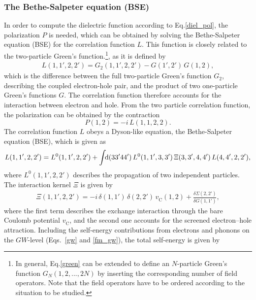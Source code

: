 \subsubsection{The Bethe-Salpeter equation (BSE)}\label{bse_subsec}
In order to compute the dielectric function according to Eq.\;\eqref{diel_pol}, the polarization $P$ is needed, which can be obtained by solving the Bethe-Salpeter equation (BSE) for the correlation function $L$. This function is closely  related to the two-particle Green's function.\footnote[2]{In general, Eq.\;\eqref{green} can be extended to define an $N$-particle Green's function $G_N(1,2,...,2N)$ by inserting the corresponding number of field operators. Note that the field operators have to be ordered according to the situation to be studied.}, as it is defined by
%
\begin{align}\label{corr}
    L(1,1',2,2') = G_2(1,1',2,2') - G(1',2')\,G(1,2), 
\end{align}
%
which is the difference between the full two-particle Green's  function $G_2$, describing the coupled electron-hole pair, and the product of two one-particle Green's functions $G$. The correlation function therefore accounts for the interaction between electron and hole. From the two particle correlation function, the polarization can be obtained by the contraction
%
\begin{equation}
    P(1,2) = -i\,L(1,1,2,2).
\end{equation}
%
The correlation function $L$ obeys a Dyson-like equation, the Bethe-Salpeter equation (BSE), which is given as
%
\begin{align}\label{bse}
        L(1,1',2,2') = L^0(1,1',2,2') + \int\text{\!\!d}(33'44')\,L^0(1,1',3,3')\,\Xi(3,3',4,4')\,L(4,4',2,2'),
\end{align}
%
where $L^0(1,1',2,2')$ describes the propagation of two independent particles. The interaction kernel $\Xi$ is given by\cite{strinati1988application}
%
\begin{align}\label{kernel}
    \Xi(1,1',2,2') = -i\,\delta(1,1')\,\delta(2,2')\,v_\text{C}^{\phantom{I}}(1,2) +  \frac{\delta\Sigma(2,2')}{\delta G(1,1')},
\end{align}
%
where the first term describes the exchange interaction through the bare Coulomb potential $v_\text{C}^{\phantom{I}}$, and the second one accounts for the screened electron–hole attraction.
\newpage
Including the self-energy contributions from electrons and phonons on the $GW$-level (Eqs.~\eqref{gw} and \eqref{fm_gw}), the total self-energy is given by
